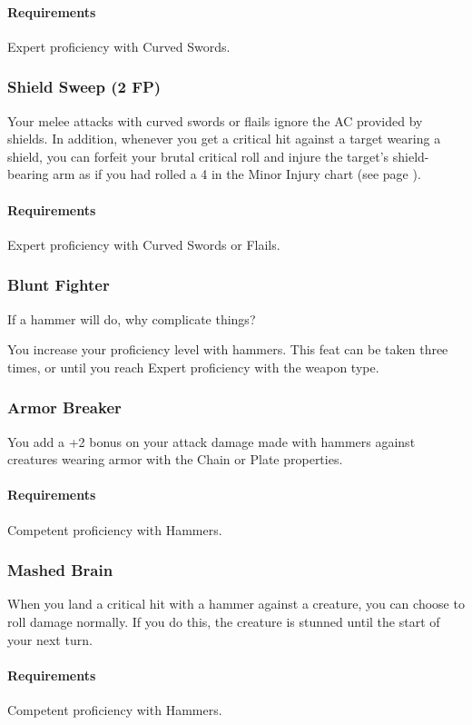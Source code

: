     \paragraph{Requirements} Expert proficiency with Curved Swords.
\subsubsection{Shield Sweep (2 FP)} \label{feat::shieldsweep}
    Your melee attacks with curved swords or flails ignore the AC provided by shields.
    In addition, whenever you get a critical hit against a target wearing a shield, you can forfeit your brutal critical roll and injure the target's shield-bearing arm as if you had rolled a 4 in the Minor Injury chart (see page \pageref{ssec::injuriesandinsanity}).
    \paragraph{Requirements} Expert proficiency with Curved Swords or Flails.
\subsubsection{Blunt Fighter} \label{feat::bluntfighter}
    If a hammer will do, why complicate things?

    You increase your proficiency level with hammers.
    This feat can be taken three times, or until you reach Expert proficiency with the weapon type.
\subsubsection{Armor Breaker} \label{feat::armorbreaker}
    You add a +2 bonus on your attack damage made with hammers against creatures wearing armor with the Chain or Plate properties.
    \paragraph{Requirements} Competent proficiency with Hammers.
\subsubsection{Mashed Brain} \label{feat::mashedbrain}
    When you land a critical hit with a hammer against a creature, you can choose to roll damage normally.
    If you do this, the creature is stunned until the start of your next turn.
    \paragraph{Requirements} Competent proficiency with Hammers.
